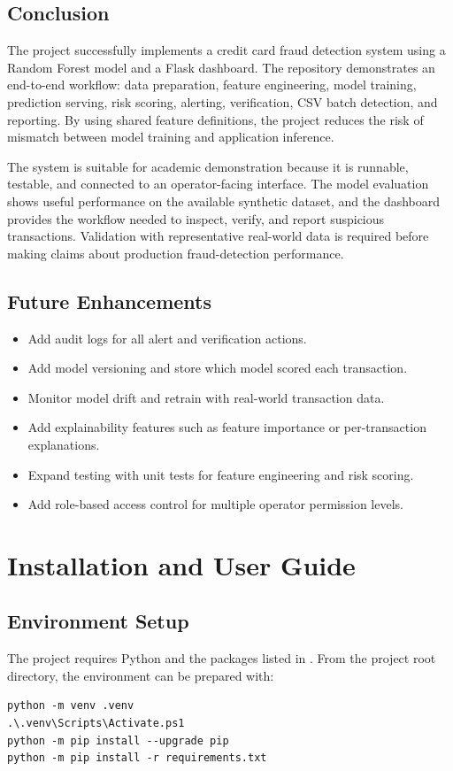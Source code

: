 \documentclass[12pt,a4paper]{report}
\begin{document}
\section{Conclusion}
The project successfully implements a credit card fraud detection system using a Random Forest model and a Flask dashboard. The repository demonstrates an end-to-end workflow: data preparation, feature engineering, model training, prediction serving, risk scoring, alerting, verification, CSV batch detection, and reporting. By using shared feature definitions, the project reduces the risk of mismatch between model training and application inference.

The system is suitable for academic demonstration because it is runnable, testable, and connected to an operator-facing interface. The model evaluation shows useful performance on the available synthetic dataset, and the dashboard provides the workflow needed to inspect, verify, and report suspicious transactions. Validation with representative real-world data is required before making claims about production fraud-detection performance.

\section{Future Enhancements}
\begin{itemize}
    \item Add audit logs for all alert and verification actions.
    \item Add model versioning and store which model scored each transaction.
    \item Monitor model drift and retrain with real-world transaction data.
    \item Add explainability features such as feature importance or per-transaction explanations.
    \item Expand testing with unit tests for feature engineering and risk scoring.
    \item Add role-based access control for multiple operator permission levels.
\end{itemize}

\appendix
\chapter{Installation and User Guide}

\section{Environment Setup}
The project requires Python and the packages listed in . From the project root directory, the environment can be prepared with:
\begin{verbatim}
python -m venv .venv
.\.venv\Scripts\Activate.ps1
python -m pip install --upgrade pip
python -m pip install -r requirements.txt
\end{verbatim}
\end{document}
